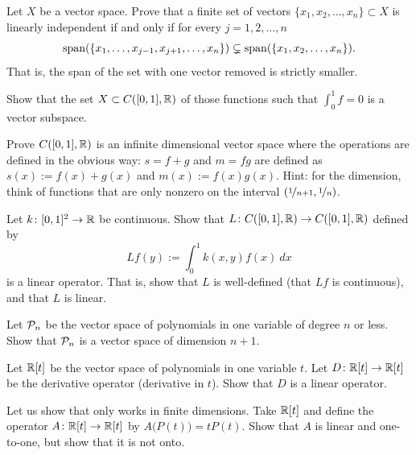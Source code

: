 \begin{exercise}
Let $X$ be a vector space.
Prove that a finite set of vectors $\{ x_1,x_2,\ldots,x_n \} \subset X$ 
is linearly independent if and only if for every $j=1,2,\ldots,n$
\begin{equation*}
\operatorname{span}( \{ x_1,\ldots,x_{j-1},x_{j+1},\ldots,x_n \}) \subsetneq
\operatorname{span}( \{ x_1,x_2,\ldots,x_n \}) .
\end{equation*}
That is, the span of the set with one vector removed is strictly smaller.
\end{exercise}

\begin{exercise}
Show that the set $X \subset C([0,1],{\mathbb{R}})$ of those functions such 
that $\int_0^1 f = 0$ is a vector subspace.
\end{exercise}

\begin{exercise}[Challenging]
Prove $C([0,1],{\mathbb{R}})$ is an infinite dimensional vector space
where the operations are defined in the obvious way:
$s=f+g$ and $m=fg$ are defined as
$s(x) := f(x)+g(x)$ and
$m(x) := f(x)g(x)$.
Hint: for the dimension, think of functions that are only nonzero
on the interval $(\nicefrac{1}{n+1},\nicefrac{1}{n})$.
\end{exercise}

\begin{exercise}
Let $k \colon [0,1]^2 \to {\mathbb{R}}$ be continuous.  Show that
$L \colon C([0,1],{\mathbb{R}}) \to C([0,1],{\mathbb{R}})$ defined by
\begin{equation*}
Lf(y) := \int_0^1 k(x,y)f(x)~dx
\end{equation*}
is a linear operator.  That is, show that $L$ is well-defined (that
$Lf$ is continuous), and that $L$ is linear.
\end{exercise}

\begin{exercise}
Let ${\mathcal{P}}_n$ be the vector space of polynomials in one variable of degree $n$
or less.  Show that ${\mathcal{P}}_n$ is a vector space of dimension $n+1$.
\end{exercise}

\begin{exercise}
Let ${\mathbb{R}}[t]$ be the vector space of polynomials in one variable $t$.  Let
$D \colon {\mathbb{R}}[t] \to {\mathbb{R}}[t]$ be the derivative operator (derivative in $t$).
Show that $D$ is a linear operator.
\end{exercise}

\begin{exercise}
Let us show that  only works in finite
dimensions.  Take ${\mathbb{R}}[t]$ and define the operator $A \colon {\mathbb{R}}[t] \to {\mathbb{R}}[t]$
by $A\bigl(P(t)\bigr) = tP(t)$.  Show that $A$ is linear and one-to-one, but
show that it is not onto.
\end{exercise}

